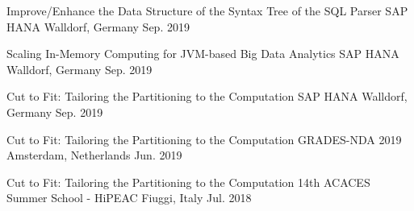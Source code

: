 \begin{cvhonors}
  \cvhonor
    {Improve/Enhance the Data Structure of the Syntax Tree of the SQL Parser} %
    {SAP HANA} %
    {Walldorf, Germany} %
    {Sep. 2019} %


  \cvhonor
    {Scaling In-Memory Computing for JVM-based Big Data Analytics} %
    {SAP HANA} %
    {Walldorf, Germany} %
    {Sep. 2019} %

  \cvhonor
    {Cut to Fit: Tailoring the Partitioning to the Computation} %
    {SAP HANA} %
    {Walldorf, Germany} %
    {Sep. 2019} %

  \cvhonor
    {Cut to Fit: Tailoring the Partitioning to the Computation} %
    {GRADES-NDA 2019} %
    {Amsterdam, Netherlands} %
    {Jun. 2019} %

  \cvhonor
    {Cut to Fit: Tailoring the Partitioning to the Computation} %
    {14th ACACES Summer School - HiPEAC} %
    {Fiuggi, Italy} %
    {Jul. 2018} %

\end{cvhonors}
